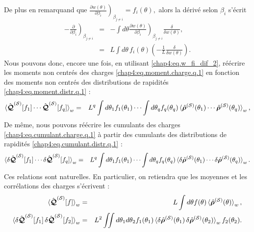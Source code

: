 De plus en remarquand que 
\(
	\left. \frac{ \partial w (\theta) }{ \partial \beta_i } \right)_{\beta_{j\neq i}} = f_i(\theta) ,		
\)
alors la dérivé selon $\beta_i$ s'écrit 
\begin{eqnarray}\label{chap4:eq.w_fi_dif_2}
	-\left. \frac{ \partial}{ \partial \beta_i } \right)_{\beta_{j\neq i}} & = & - \int d \theta  \left. \frac{ \partial w (\theta) }{ \partial \beta_i } \right)_{\beta_{j\neq i}} \frac{\delta}{\delta w(\theta)} \nonumber ,\\
	& = & L \int d\theta \, f_i(\theta) \left ( - \frac{1}{L} 	\frac{\delta}{\delta w(\theta)} \right ) \label{chap4:eq.moment.charge.q.2}.
\end{eqnarray}
Nous pouvons donc, encore une fois, en utilisant \eqref{chap4:eq.w_fi_dif_2}, réécrire les moments non centrés des charges \eqref{chap4:eq.moment.charge.q.1} en fonction des moments non centrés des distributions de rapidités \eqref{chap4:eq.moment.distr.q.1} : 
\begin{eqnarray}
	\braket{\hat{\bm{\mathcal{Q}}}^{(\mathcal{S})}[f_1] \cdots \hat{\bm{\mathcal{Q}}}^{(\mathcal{S})}[f_q]}_w  & = & L^q \int d\theta_1 f_1(\theta_1)  \cdots  \int d\theta_q f_q(\theta_q)  \braket{\hat{\bm{\rho}}^{(\mathcal{S})}(\theta_1)\cdots \hat{\bm{\rho}}^{(\mathcal{S})}(\theta_q)}_w,	
\end{eqnarray}
De même, nous pouvons réécrire les cumulants des charges \eqref{chap4:eq.cumulant.charge.q.1} à partir des cumulants des distributions de rapidités \eqref{chap4:eq.cumulant.distr.q.1} :
\begin{eqnarray}
	\braket{\delta\hat{\bm{\mathcal{Q}}}^{(\mathcal{S})}[f_1] \cdots \delta\hat{\bm{\mathcal{Q}}}^{(\mathcal{S})}[f_q]}_w  & = & L^q \int d\theta_1 f_1(\theta_1)  \cdots  \int d\theta_q f_q(\theta_q)  \braket{\delta\hat{\bm{\rho}}^{(\mathcal{S})}(\theta_1)\cdots \delta\hat{\bm{\rho}}^{(\mathcal{S})}(\theta_q)}_w.	
\end{eqnarray}
Ces relations sont naturelles. En particulier, on retiendra que les moyennes et les corrélations des charges s’écrivent :
\begin{eqnarray}
	\braket{\hat{\bm{\mathcal{Q}}}^{(\mathcal{S})}[f] }_w  & = & L \int d\theta f(\theta)  \braket{\hat{\bm{\rho}}^{(\mathcal{S})}(\theta)}_w,\\
	\braket{\delta\hat{\bm{\mathcal{Q}}}^{(\mathcal{S})}[f_1] \label{chap4:eq.moment.distr.q.10}\, \delta\hat{\bm{\mathcal{Q}}}^{(\mathcal{S})}[f_2]}_w  & = & L^2 \iint d\theta_1 d\theta_2 f_1(\theta_1) \braket{\delta\hat{\bm{\rho}}^{(\mathcal{S})}(\theta_1)\, \delta\hat{\bm{\rho}}^{(\mathcal{S})}(\theta_2)}_w  f_2(\theta_2) \label{chap4:eq.cumulant.distr.q.10} .		
\end{eqnarray}



